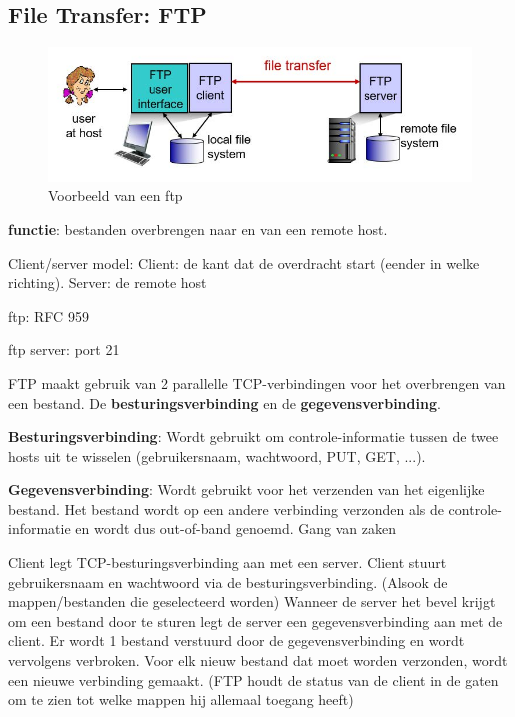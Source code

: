 \newpage

\subsection{File Transfer: FTP}

\begin{figure}[h]
\centering
\includegraphics[width=4.5in]{./img/imghfdst2/ftp.jpg}
\caption{Voorbeeld van een ftp }
\label{fig:ftp}
\end{figure}

\noindent \textbf{functie}: bestanden overbrengen naar en van een remote host.

\noindent Client/server model:
\bi
\itf Client: de kant dat de overdracht start (eender in welke richting).
\itf Server: de remote host
\ei

\noindent ftp: RFC 959

\noindent ftp server: port 21

\noindent FTP maakt gebruik van 2 parallelle TCP-verbindingen voor het overbrengen van een bestand. De \textbf{besturingsverbinding} en de \textbf{gegevensverbinding}.

\noindent \textbf{Besturingsverbinding}: Wordt gebruikt om controle-informatie tussen de twee hosts uit te wisselen (gebruikersnaam, wachtwoord, PUT, GET, ...).

\noindent \textbf{Gegevensverbinding}: Wordt gebruikt voor het verzenden van het eigenlijke bestand. Het bestand wordt op een andere verbinding verzonden als de controle-informatie en wordt dus out-of-band genoemd.
Gang van zaken

\be
\itf Client legt TCP-besturingsverbinding aan met een server.
\itf Client stuurt gebruikersnaam en wachtwoord via de besturingsverbinding. (Alsook de mappen/bestanden die geselecteerd worden)
\itf Wanneer de server het bevel krijgt om een bestand door te sturen legt de server een gegevensverbinding aan met de client.
\itf Er wordt 1 bestand verstuurd door de gegevensverbinding en wordt vervolgens verbroken. Voor elk nieuw bestand dat moet worden verzonden, wordt een nieuwe verbinding gemaakt.
\itf (FTP houdt de status van de client in de gaten om te zien tot welke mappen hij allemaal toegang heeft)
\ee

